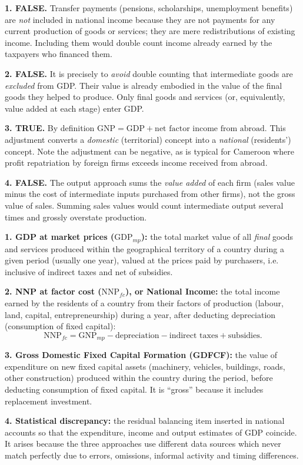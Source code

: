 \documentclass[11pt]{article}
\newcommand{\cle}[1]{{\popxbold\color{popdark}#1}}
\begin{document}
\begin{corrige}
\textbf{1. FALSE.} \cle{Transfer payments} (pensions, scholarships, unemployment benefits) are \emph{not} included in national income because they are not payments for any current production of goods or services; they are mere redistributions of existing income. Including them would double count income already earned by the taxpayers who financed them.

\textbf{2. FALSE.} It is precisely to \emph{avoid} \cle{double counting} that intermediate goods are \emph{excluded} from GDP. Their value is already embodied in the value of the final goods they helped to produce. Only final goods and services (or, equivalently, \cle{value added} at each stage) enter GDP.

\textbf{3. TRUE.} By definition $\mathrm{GNP} = \mathrm{GDP} + \text{net factor income from abroad}$. This adjustment converts a \emph{domestic} (territorial) concept into a \emph{national} (residents') concept. Note the adjustment can be negative, as is typical for Cameroon where profit repatriation by foreign firms exceeds income received from abroad.

\textbf{4. FALSE.} The \cle{output approach} sums the \emph{value added} of each firm (sales value minus the cost of intermediate inputs purchased from other firms), not the gross value of sales. Summing sales values would count intermediate output several times and grossly overstate production.
\end{corrige}

\begin{corrige}
\textbf{1. \cle{GDP at market prices} ($\mathrm{GDP}_{mp}$):} the total market value of all \emph{final} goods and services produced within the geographical territory of a country during a given period (usually one year), valued at the prices paid by purchasers, i.e. inclusive of indirect taxes and net of subsidies.

\textbf{2. \cle{NNP at factor cost} ($\mathrm{NNP}_{fc}$), or \cle{National Income}:} the total income earned by the residents of a country from their factors of production (labour, land, capital, entrepreneurship) during a year, after deducting \cle{depreciation} (consumption of fixed capital):
\[
\mathrm{NNP}_{fc} = \mathrm{GNP}_{mp} - \text{depreciation} - \text{indirect taxes} + \text{subsidies}.
\]

\textbf{3. \cle{Gross Domestic Fixed Capital Formation} (GDFCF):} the value of expenditure on new fixed capital assets (machinery, vehicles, buildings, roads, other construction) produced within the country during the period, before deducting consumption of fixed capital. It is ``gross'' because it includes replacement investment.

\textbf{4. \cle{Statistical discrepancy}:} the residual balancing item inserted in national accounts so that the expenditure, income and output estimates of GDP coincide. It arises because the three approaches use different data sources which never match perfectly due to errors, omissions, informal activity and timing differences.
\end{corrige}
\end{document}
